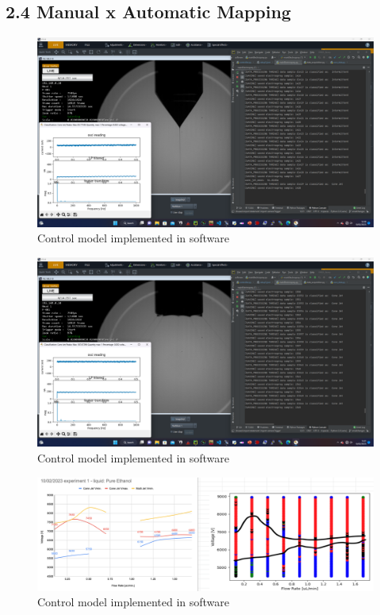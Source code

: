 \subsection*{2.4 Manual x Automatic Mapping}


    \begin{figure}[H]
        \center
        \includegraphics[width=15cm]{images/image_folder_report_4/experiment_print1.png}
        \caption{Control model implemented in software}
    \end{figure}

    \begin{figure}[H]
        \center
        \includegraphics[width=15cm]{images/image_folder_report_4/multi_jet_print.png}
        \caption{Control model implemented in software}
    \end{figure}


    \begin{figure}[H]
        \center
        \includegraphics[width=15cm]{images/image_folder_report_4/mapXman-1.png}
        \caption{Control model implemented in software}
    \end{figure}


